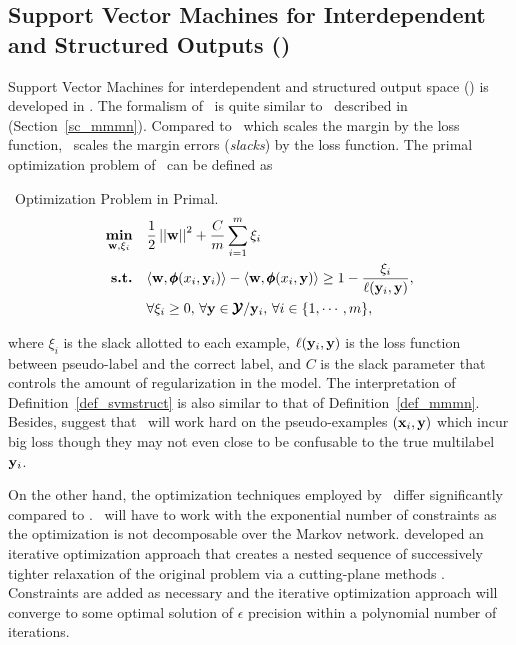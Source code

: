 {%
% 
\subsection{Support Vector Machines for Interdependent and Structured Outputs (\svmstruct)} \label{sc_svmstruct}

Support Vector Machines for interdependent and structured output space (\svmstruct) is developed in \citep{THJA04,TJTA05}.
The formalism of \svmstruct\ is quite similar to \mmmn\ described in (Section~\ref{sc_mmmn}).
Compared to \mmmn\ which scales the margin by the loss function, \svmstruct\ scales the margin errors ({\em slacks}) by the loss function.
The primal optimization problem of \svmstruct\ can be defined as
\begin{definition}{\svmstruct\ Optimization Problem in Primal.}\label{def_svmstruct}
	\begin{align*}
		\underset{\mathbf {w},\xi_i}{\textbf{min}} & \quad\frac{1}{2}\left|\left| \mathbf {w} \right|\right|^2 + \frac{C}{m}\sum_{i=1}^{m}\xi_i \\
		\textbf{s.t.} & \quad\langle \mathbf {w}, \pmb \phi(x_i,\mathbf {y}_i) \rangle - \langle \mathbf {w}, \pmb \phi(x_i,\mathbf {y}) \rangle \ge 1-\frac{\xi_i}{\mathbf {\ell}(\mathbf {y}_i,\mathbf {y})},\\
		& \quad \forall \xi_i\ge0,\, \forall \mathbf {y}\in\pmb {\mathcal{Y}}/\mathbf {y}_i,\, \forall i\in\{1,\cdots,m\},
	\end{align*}
\end{definition}
\noindent
where $\xi_i$ is the slack allotted to each example, $\mathbf {\ell}(\mathbf {y}_i,\mathbf {y})$ is the loss function between pseudo-label and the correct label, and $C$ is the slack parameter that controls the amount of regularization in the model.
The interpretation of Definition~\ref{def_svmstruct} is also similar to that of Definition~\ref{def_mmmn}.
Besides, \citet{THJA04} suggest that \mmmn\ will work hard on the pseudo-examples $(\mathbf {x}_i,\mathbf {y})$ which incur big loss though they may not even close to be confusable to the true multilabel $\mathbf {y}_i$.

On the other hand, the optimization techniques employed by \svmstruct\ differ significantly compared to \mmmn.
\svmstruct\ will have to work with the exponential number of constraints as the optimization is not decomposable over the Markov network.
\citet{THJA04} developed an iterative optimization approach that creates a nested sequence of successively tighter relaxation of the original problem via a cutting-plane methods \citep{Bishop07,JFY09}.
Constraints are added as necessary and the iterative optimization approach will converge to some optimal solution of $\epsilon$ precision within a polynomial number of iterations.

}
